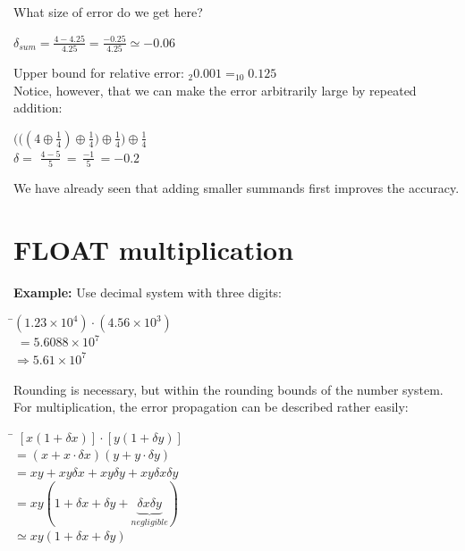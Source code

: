 \documentclass[a4paper,12pt,]{report}
\begin{document}
	What size of error do we get here?

\begin{center}
	\large{$\delta_{sum}=\frac{4-4.25}{4.25}=\frac{-0.25}{4.25}\simeq -0.06$}
\end{center}

	\medskip
	Upper bound for relative error: $_2 0.001 = _{10}0.125$\\

	Notice, however, that we can make the error arbitrarily large by repeated addition:

\begin{center}
	$\bigg(\Big(\left(4 \oplus \frac{1}{4}\right)\oplus \frac{1}{4}\Big)\oplus \frac{1}{4}\bigg)\oplus \frac{1}{4}$\\
	\medskip
	\large{$\delta =$ \Large{$\frac{4-5}{5}$}$\,=\,$\Large{$\frac{-1}{5}$}$\,=-0.2$}\\
\end{center}
	\medskip

	We have already seen that adding smaller summands first improves the accuracy.

\section{FLOAT multiplication}

	\noindent \textbf{Example:} Use decimal system with three digits:

\begin{tabbing}
	\hspace*{5cm} \=$(1.23 \times 10^4)\cdot(4.56 \times 10^3)$\\
	\> $\;=5.6088 \times 10^7$\\
	\> $\Rightarrow 5.61 \times 10^7$
\end{tabbing}

	Rounding is necessary, but within the rounding bounds of the number system.  For multiplication, 
	the error propagation can be described rather easily:

\begin{tabbing}
	\hspace*{5cm}\= $[x(1+\delta x)]\cdot[y(1+\delta y)]$\\
	\>$= (x+x\cdot\delta x)(y+y\cdot\delta y)$\\
	\>$= xy + xy\delta x + xy\delta y + xy \delta x \delta y$\\
	\> $= xy(1 + \delta x + \delta y + \!\!\!\underbrace{\delta x \delta y}_{negligible}\!\!\!)$\\
	\> $\simeq xy(1+ \delta x + \delta y)$
\end{tabbing}
\end{document}

